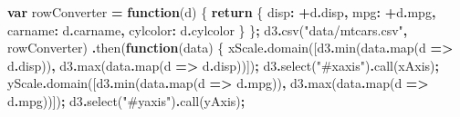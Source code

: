 \documentclass[
  openany]{book}
\newenvironment{Shaded}{\begin{snugshade}}{\end{snugshade}}
\newcommand{\AttributeTok}[1]{\textcolor[rgb]{0.77,0.63,0.00}{#1}}
\newcommand{\ControlFlowTok}[1]{\textcolor[rgb]{0.13,0.29,0.53}{\textbf{#1}}}
\newcommand{\DataTypeTok}[1]{\textcolor[rgb]{0.13,0.29,0.53}{#1}}
\newcommand{\FunctionTok}[1]{\textcolor[rgb]{0.00,0.00,0.00}{#1}}
\newcommand{\KeywordTok}[1]{\textcolor[rgb]{0.13,0.29,0.53}{\textbf{#1}}}
\newcommand{\NormalTok}[1]{#1}
\newcommand{\OperatorTok}[1]{\textcolor[rgb]{0.81,0.36,0.00}{\textbf{#1}}}
\newcommand{\StringTok}[1]{\textcolor[rgb]{0.31,0.60,0.02}{#1}}
\begin{document}
\begin{Shaded}
\begin{Highlighting}[]
\KeywordTok{var}\NormalTok{ rowConverter }\OperatorTok{=} \KeywordTok{function}\NormalTok{(d) \{}
  \ControlFlowTok{return}\NormalTok{ \{}
    \DataTypeTok{disp}\OperatorTok{:} \OperatorTok{+}\NormalTok{d}\OperatorTok{.}\AttributeTok{disp}\OperatorTok{,}
    \DataTypeTok{mpg}\OperatorTok{:} \OperatorTok{+}\NormalTok{d}\OperatorTok{.}\AttributeTok{mpg}\OperatorTok{,}
    \DataTypeTok{carname}\OperatorTok{:}\NormalTok{ d}\OperatorTok{.}\AttributeTok{carname}\OperatorTok{,}
    \DataTypeTok{cylcolor}\OperatorTok{:}\NormalTok{ d}\OperatorTok{.}\AttributeTok{cylcolor}
\NormalTok{  \}}
\NormalTok{\}}\OperatorTok{;}
\NormalTok{d3}\OperatorTok{.}\FunctionTok{csv}\NormalTok{(}\StringTok{"data/mtcars.csv"}\OperatorTok{,}\NormalTok{ rowConverter)}
  \OperatorTok{.}\FunctionTok{then}\NormalTok{(}\KeywordTok{function}\NormalTok{(data) \{}
\NormalTok{    xScale}\OperatorTok{.}\FunctionTok{domain}\NormalTok{([d3}\OperatorTok{.}\FunctionTok{min}\NormalTok{(data}\OperatorTok{.}\FunctionTok{map}\NormalTok{(d }\KeywordTok{=\textgreater{}}\NormalTok{ d}\OperatorTok{.}\AttributeTok{disp}\NormalTok{))}\OperatorTok{,}\NormalTok{ d3}\OperatorTok{.}\FunctionTok{max}\NormalTok{(data}\OperatorTok{.}\FunctionTok{map}\NormalTok{(d }\KeywordTok{=\textgreater{}}\NormalTok{ d}\OperatorTok{.}\AttributeTok{disp}\NormalTok{))])}\OperatorTok{;}
\NormalTok{    d3}\OperatorTok{.}\FunctionTok{select}\NormalTok{(}\StringTok{"\#xaxis"}\NormalTok{)}\OperatorTok{.}\FunctionTok{call}\NormalTok{(xAxis)}\OperatorTok{;}
\NormalTok{    yScale}\OperatorTok{.}\FunctionTok{domain}\NormalTok{([d3}\OperatorTok{.}\FunctionTok{min}\NormalTok{(data}\OperatorTok{.}\FunctionTok{map}\NormalTok{(d }\KeywordTok{=\textgreater{}}\NormalTok{ d}\OperatorTok{.}\AttributeTok{mpg}\NormalTok{))}\OperatorTok{,}\NormalTok{ d3}\OperatorTok{.}\FunctionTok{max}\NormalTok{(data}\OperatorTok{.}\FunctionTok{map}\NormalTok{(d }\KeywordTok{=\textgreater{}}\NormalTok{ d}\OperatorTok{.}\AttributeTok{mpg}\NormalTok{))])}\OperatorTok{;}
\NormalTok{    d3}\OperatorTok{.}\FunctionTok{select}\NormalTok{(}\StringTok{"\#yaxis"}\NormalTok{)}\OperatorTok{.}\FunctionTok{call}\NormalTok{(yAxis)}\OperatorTok{;}


\end{Highlighting}
\end{Shaded}
\end{document}
